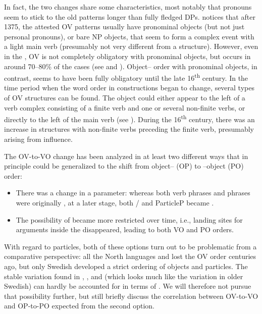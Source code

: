 \documentclass[output=paper]{langscibook}
\begin{document}
In fact, the two changes share some characteristics, most notably that pronouns seem to stick to the old patterns longer than fully fledged DPs. \citet[174]{Delsing1999} notices that after 1375, the attested OV patterns usually have pronominal objects (but not just personal pronouns), or bare NP objects, that seem to form a complex event with a light main verb (presumably not very different from a  structure). However, even in the , OV is not completely obligatory with pronominal objects, but occurs in around 70–80\% of the cases (see \citealt{Delsing1999} and ). Object– order with pronominal objects, in contrast, seems to have been fully obligatory until the late 16\textsuperscript{th} century. In the time period when the word order in  constructions began to change, several types of OV structures can be found. The object could either appear to the left of a verb complex consisting of a finite verb and one or several non-finite verbs, or directly to the left of the main verb (see \citealt{Petzell2011, Petzell2012}). During the 16\textsuperscript{th} century, there was an increase in structures with non-finite verbs preceding the finite verb, presumably arising from  influence.



The OV-to-VO change has been analyzed in at least two different ways that in principle could be generalized to the shift from object– (OP) to –object (PO) order: 


\begin{itemize}
\item There was a change in a  parameter: whereas both verb phrases and  phrases were originally , at a later stage, both / and ParticleP became .
\item The possibility of  became more restricted over time, i.e., landing sites for arguments inside the  disappeared, leading to both VO and PO orders.
\end{itemize}

With regard to particles, both of these options turn out to be problematic from a comparative perspective: all the North  languages and  lost the OV order centuries ago, but only Swedish developed a strict ordering of objects and particles. The stable variation found in , , and  (which looks much like the variation in older Swedish) can hardly be accounted for in terms of . We will therefore not pursue that possibility further, but still briefly discuss the correlation between OV-to-VO and OP-to-PO expected from the second option.
\end{document}
